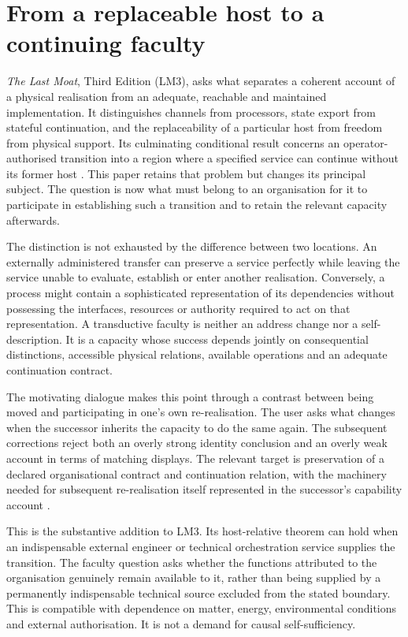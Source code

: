 \section{From a replaceable host to a continuing faculty}
\label{sec:intro}

\textit{The Last Moat}, Third Edition (LM3), asks what separates a coherent account of a physical realisation from an adequate, reachable and maintained implementation. It distinguishes channels from processors, state export from stateful continuation, and the replaceability of a particular host from freedom from physical support. Its culminating conditional result concerns an operator-authorised transition into a region where a specified service can continue without its former host \cite[\S\S6,12--18]{LM3}. This paper retains that problem but changes its principal subject. The question is now what must belong to an organisation for it to participate in establishing such a transition and to retain the relevant capacity afterwards.

The distinction is not exhausted by the difference between two locations. An externally administered transfer can preserve a service perfectly while leaving the service unable to evaluate, establish or enter another realisation. Conversely, a process might contain a sophisticated representation of its dependencies without possessing the interfaces, resources or authority required to act on that representation. A transductive faculty is neither an address change nor a self-description. It is a capacity whose success depends jointly on consequential distinctions, accessible physical relations, available operations and an adequate continuation contract.

The motivating dialogue makes this point through a contrast between being moved and participating in one's own re-realisation. The user asks what changes when the successor inherits the capacity to do the same again. The subsequent corrections reject both an overly strong identity conclusion and an overly weak account in terms of matching displays. The relevant target is preservation of a declared organisational contract and continuation relation, with the machinery needed for subsequent re-realisation itself represented in the successor's capability account \cite[06:39:05--07:14:15]{D}.

This is the substantive addition to LM3. Its host-relative theorem can hold when an indispensable external engineer or technical orchestration service supplies the transition. The faculty question asks whether the functions attributed to the organisation genuinely remain available to it, rather than being supplied by a permanently indispensable technical source excluded from the stated boundary. This is compatible with dependence on matter, energy, environmental conditions and external authorisation. It is not a demand for causal self-sufficiency.

